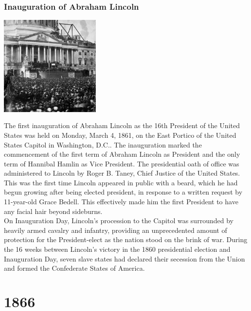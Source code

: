 \documentclass[11pt]{report}
\begin{document}
\subsection{Inauguration of Abraham Lincoln}
\vspace{2mm}\begin{center}\includegraphics[width=5cm]{./img/inaugLincoln.jpg}\end{center}
The first inauguration of Abraham Lincoln as the 16th President of the United States was held on Monday, March 4, 1861, on the East Portico of the United States Capitol in Washington, D.C.. The inauguration marked the commencement of the first term of Abraham Lincoln as President and the only term of Hannibal Hamlin as Vice President. The presidential oath of office was administered to Lincoln by Roger B. Taney, Chief Justice of the United States.\\
This was the first time Lincoln appeared in public with a beard, which he had begun growing after being elected president, in response to a written request by 11-year-old Grace Bedell. This effectively made him the first President to have any facial hair beyond sideburns.\\
On Inauguration Day, Lincoln's procession to the Capitol was surrounded by heavily armed cavalry and infantry, providing an unprecedented amount of protection for the President-elect as the nation stood on the brink of war. During the 16 weeks between Lincoln's victory in the 1860 presidential election and Inauguration Day, seven slave states had declared their secession from the Union and formed the Confederate States of America.

\chapter{1866}
\section{}
\end{document}
